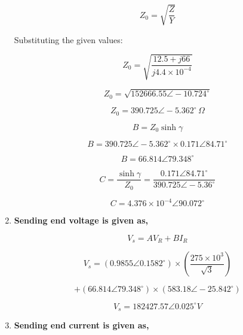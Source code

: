 \documentclass[12pt]{article}
\begin{document}
\begin{enumerate}
	\begin{equation}
		Z_0 = \sqrt{\frac{Z}{Y}}
	\end{equation}
	
	Substituting the given values:
	
	
	\[Z_0 = \sqrt{\frac{12.5 + j66}{j4.4 \times 10^{-4}}} \]
	
	
	\[Z_0 = \sqrt{152666.55 \angle -10.724^\circ} \]
	
	\begin{equation}
		Z_0 = 390.725 \angle -5.362^\circ \, \Omega
	\end{equation}
	
	
	\begin{equation}
		B = Z_0 \sinh \gamma
	\end{equation}
	
	\[ B = 390.725 \angle -5.362^\circ \times 0.171 \angle 84.71^\circ \]
	
	\begin{equation}
		B = 66.814 \angle 79.348^\circ
	\end{equation}
	
	\begin{equation}
		C = \frac{\sinh \gamma}{Z_0} = \frac{0.171 \angle 84.71^\circ}{390.725 \angle -5.36^\circ}
	\end{equation}
	
	\begin{equation}
		C = 4.376 \times 10^{-4} \angle 90.072^\circ
	\end{equation}
	
	
	
	
	
	\item \textbf{Sending end voltage is given as,}
	
	\begin{equation}
		V_s = A V_R + B I_R
	\end{equation}
	
	\[
	V_s = (0.9855 \angle 0.1582^\circ) \times \left( \frac{275 \times 10^3}{\sqrt{3}} \right)
	\]
	
	\[
	+ (66.814 \angle 79.348^\circ) \times (583.18 \angle -25.842^\circ)
	\]
	
	\begin{equation}
		V_s = 182427.57 \angle 0.025^\circ V
	\end{equation}
	
	
	\item \textbf{Sending end current is given as, }
	

\end{enumerate}
\end{document}
